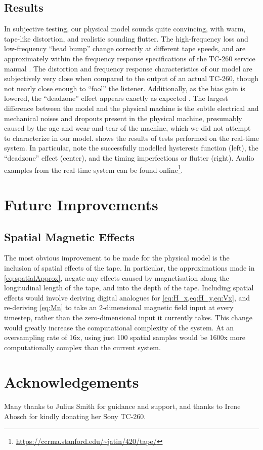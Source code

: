 \documentclass[twoside,a4paper]{article}
\begin{document}
\subsection{Results}
In subjective testing, our physical model sounds quite convincing,
with warm, tape-like distortion, and realistic sounding
flutter. The high-frequency loss and low-frequency
``head bump'' change correctly at different tape speeds,
and are approximately within the frequency response
specifications of the TC-260 service manual \cite{RefManual}.
The distortion and frequency response characteristics
of our model are subjectively very close when compared to
the output of an actual TC-260, though not nearly close enough to 
``fool'' the listener. Additionally, as the bias
gain is lowered, the ``deadzone'' effect appears exactly
as expected \cite{Camras:1987:MRH:27189}.
The largest difference between the model and the physical
machine is the subtle electrical and mechanical noises
and dropouts present in the physical machine, presumably
caused by the age and wear-and-tear of the machine, which
we did not attempt to characterize in our model.
 shows the results
of tests performed on the real-time system. In particular,
note the successfully modelled hysteresis function (left),
the ``deadzone'' effect (center), and the timing imperfections
or flutter (right). Audio examples from the real-time
system can be found online\footnote{\url{https://ccrma.stanford.edu/~jatin/420/tape/}}.

\section{Future Improvements}
\subsection{Spatial Magnetic Effects}
The most obvious improvement to be made for the physical model
is the inclusion of spatial effects of the tape. In particular,
the approximations made in \cref{eq:spatialApprox}, negate any
effects caused by magnetisation along the longitudinal length
of the tape, and into the depth of the tape. Including spatial
effects would involve deriving digital analogues for
\cref{eq:H_x,eq:H_y,eq:Vx}, and re-deriving \cref{eq:Mn}
to take an 2-dimensional magnetic field input at every timestep,
rather than the zero-dimensional input it currently takes. This change
would greatly increase the computational complexity of the system.
At an oversampling rate of 16x,
using just 100 spatial samples would be 1600x more
computationally complex than the current system.

\section{Acknowledgements}
Many thanks to Julius Smith for guidance and support, and
thanks to Irene Abosch for kindly donating her Sony TC-260.

\nocite{*}


\end{document}

